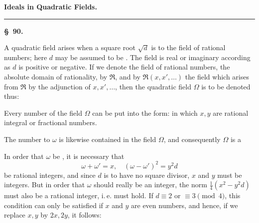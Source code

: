 
\begin{center}

\textbf{\Large Ideals in Quadratic Fields.}

\rule{3cm}{0.4pt}
\end{center}

\begin{center}
\textbf{\S\ 90. }
\end{center}

A quadratic field arises when a square root $\sqrt{d}$ is  to the
field of rational numbers; here $d$ may be assumed to be . The field is real or imaginary according as $d$ is positive or negative. If we denote the field of
rational numbers, the absolute domain of rationality, by $\mathfrak{R}$, and
by $\mathfrak{R}(x,x',\dots)$ the field which arises from $\mathfrak{R}$ by the adjunction of $x,x',\dots$,
then the quadratic field $\Omega$ is to be denoted thus:

Every number of the field $\Omega$ can be put into the form:
in which $x, y$ are rational integral or fractional numbers.

The number  to $\omega$
is likewise contained in the field $\Omega$, and consequently $\Omega$ is a

In order that $\omega$ be , it is necessary that
\[
\omega+\omega'=x,\quad(\omega-\omega')^2=y^2 d
\]
be rational integers, and since $d$ is to have no square divisor,
$x$ and $y$ must be integers. But in order that $\omega$ should really be an
integer, the norm $\frac{1}{4}(x^2-y^2 d)$ must also be a rational integer, i.\,e.
must hold. If $d\equiv 2$ or $\equiv 3\pmod 4$, this condition can only be
satisfied if $x$ and $y$ are even numbers, and hence, if we replace
$x, y$ by $2x, 2y$, it follows:
